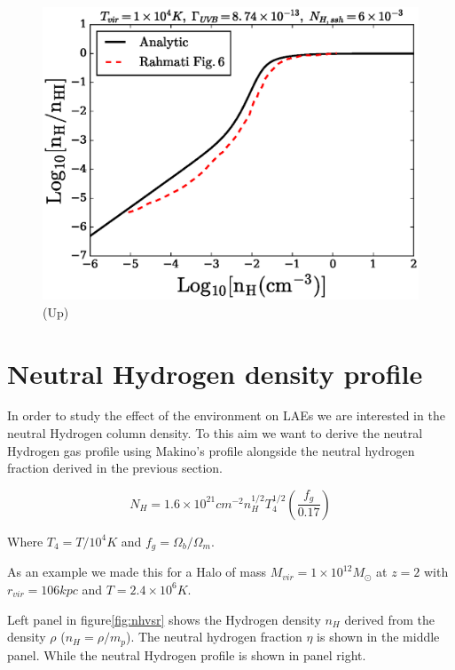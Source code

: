 \documentclass[12pt]{article}
\begin{document}
\begin{figure}[H]
\centering
\includegraphics[scale=0.5]{../figures/nhvseta.eps}
\caption{(Up)\label{fig:eta}}
\end{figure}

\section{Neutral Hydrogen density profile}\label{sec:NHI}

In order to study the effect of the environment on LAEs we are
interested in the neutral Hydrogen column density.
To this aim we want to derive the neutral Hydrogen gas profile using Makino's profile
alongside the neutral hydrogen fraction derived in the previous section.

\begin{equation}
N_H = 1.6 \times 10^{21} cm^{-2} n_H^{1/2}T_4^{1/2}\left(\dfrac{f_g}{0.17} \right)
\end{equation}

Where $T_4 = T/10^{4}K$ and $f_g =\Omega_b/ \Omega_m$.

As an example we made this for a Halo of mass $M_{vir} = 1 \times
10^{12} M_{\odot}$ at $z=2$ with $r_{vir}=106kpc$ and $T =2.4\times10^{6}K$.

Left panel in figure\ref{fig:nhvsr} shows the Hydrogen density $n_H$ derived from the density $\rho$
($n_H = \rho / m_p$). The neutral hydrogen fraction $\eta$ is shown in
the middle panel. While the neutral Hydrogen profile is shown in panel
right.
\end{document}

